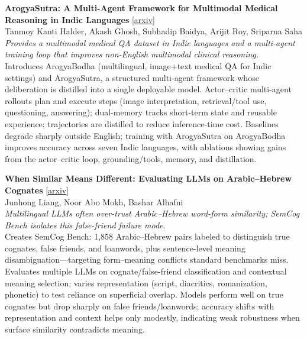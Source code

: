 \documentclass[12pt,letterpaper]{article}
\begin{document}
\medskip

{\small\textbf{ArogyaSutra: A Multi-Agent Framework for Multimodal Medical Reasoning in Indic Languages}} {\scriptsize[\href{https://arxiv.org/abs/2606.13572}{arxiv}]}\\
{\scriptsize Tanmoy Kanti Halder, Akash Ghosh, Subhadip Baidya, Arijit Roy, Sriparna Saha}\\

{\small\textit{Provides a multimodal medical QA dataset in Indic languages and a multi-agent training loop that improves non-English multimodal clinical reasoning.}}\\[1pt]
{\footnotesize Introduces ArogyaBodha (multilingual, image+text medical QA for Indic settings) and ArogyaSutra, a structured multi-agent framework whose deliberation is distilled into a single deployable model. Actor--critic multi-agent rollouts plan and execute steps (image interpretation, retrieval/tool use, questioning, answering); dual-memory tracks short-term state and reusable experience; trajectories are distilled to reduce inference-time cost. Baselines degrade sharply outside English; training with ArogyaSutra on ArogyaBodha improves accuracy across seven Indic languages, with ablations showing gains from the actor--critic loop, grounding/tools, memory, and distillation.}

\medskip

{\small\textbf{When Similar Means Different: Evaluating LLMs on Arabic--Hebrew Cognates}} {\scriptsize[\href{https://arxiv.org/abs/2606.13218}{arxiv}]}\\
{\scriptsize Junhong Liang, Noor Abo Mokh, Bashar Alhafni}\\

{\small\textit{Multilingual LLMs often over-trust Arabic--Hebrew word-form similarity; SemCog Bench isolates this false-friend failure mode.}}\\[1pt]
{\footnotesize Creates SemCog Bench: 1,858 Arabic--Hebrew pairs labeled to distinguish true cognates, false friends, and loanwords, plus sentence-level meaning disambiguation---targeting form--meaning conflicts standard benchmarks miss. Evaluates multiple LLMs on cognate/false-friend classification and contextual meaning selection; varies representation (script, diacritics, romanization, phonetic) to test reliance on superficial overlap. Models perform well on true cognates but drop sharply on false friends/loanwords; accuracy shifts with representation and context helps only modestly, indicating weak robustness when surface similarity contradicts meaning.}
\end{document}
